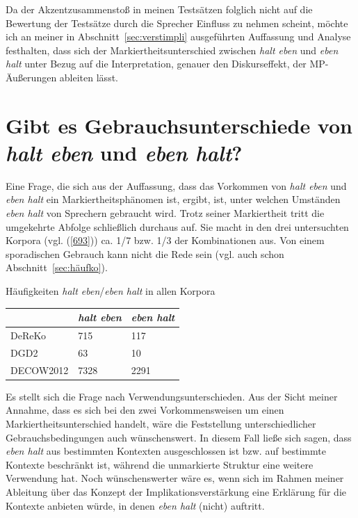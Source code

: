 Da der Akzentzusammenstoß in meinen Testsätzen folglich nicht auf die Bewertung der Testsätze durch die Sprecher Einfluss zu nehmen scheint, möchte ich an meiner in Abschnitt~\ref{sec:verstimpli} ausgeführten Auffassung und Analyse festhalten, dass sich der Markiertheitsunterschied zwischen \textit{halt eben} und \textit{eben halt} unter Bezug auf die Interpretation, genauer den Diskurseffekt, der MP-Äußerungen ableiten lässt. 

\setcounter{equation}{0}
\section{Gibt es Gebrauchsunterschiede von \textit{halt eben} und \textit{eben halt}?}
\label{sec:gebrauchheeh}
Eine Frage, die sich aus der Auffassung, dass das Vorkommen von \textit{halt eben} und \textit{eben halt} ein Markiertheitsphänomen ist, ergibt, ist, unter welchen Umständen \textit{eben halt} von Sprechern gebraucht wird. Trotz seiner Markiertheit tritt die umgekehrte Abfolge schließlich durchaus auf. Sie macht in den drei untersuchten Korpora (vgl. (\ref{693})) ca. 1/7 bzw. 1/3 der Kombinationen aus. Von einem spora\-dischen Gebrauch kann nicht die Rede sein (vgl. auch schon Abschnitt~\ref{sec:häufko}). 

\begin{exe}
	\ex\label{693} Häufigkeiten \textit{halt eben}/\textit{eben halt} in allen Korpora\\[-1em]
	\begin{tabular}[t]{|l|l|l|}
	\hline
	{} & \textit{halt eben} & \textit{eben halt}\\
	\hline
	DeReKo & 715 & 117\\
	\hline
	DGD2 & 63 & 10\\
	\hline
	DECOW2012 & 7328 & 2291\\
	\hline
    \end{tabular}
\end{exe}
Es stellt sich die Frage nach Verwendungsunterschieden. Aus der Sicht meiner Annahme, dass es sich bei den zwei Vorkommensweisen um einen Markiertheits\-unterschied handelt, wäre die Feststellung unterschiedlicher Gebrauchsbedingungen auch wünschenswert. In diesem Fall ließe sich sagen, dass \textit{eben halt} aus bestimmten Kontexten ausgeschlossen ist bzw. auf bestimmte Kontexte beschränkt ist, während die unmarkierte Struktur eine weitere Verwendung hat. Noch wünschenswerter wäre es, wenn sich im Rahmen meiner Ableitung über das Konzept der Implikationsverstärkung eine Erklärung für die Kontexte anbieten würde, in denen \textit{eben halt} (nicht) auftritt.

